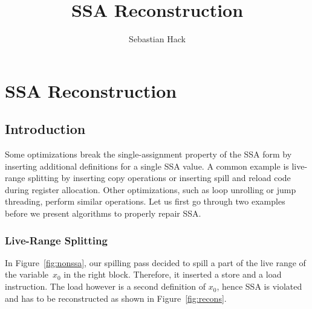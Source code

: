 
\newcommand{\var}[1]{\mathtt{#1}}

\title{SSA Reconstruction}
\author{Sebastian Hack}

\chapter{SSA Reconstruction }
\graphicspath{{repair_maintain_ssa_after_optimization/}{part1/repair_maintain_ssa_after_optimization/}}



\section{Introduction}

Some optimizations break the single-assignment property of the SSA form by inserting additional definitions for a single SSA value.
A common example is live-range splitting by inserting copy operations or inserting spill and reload code during register allocation.
Other optimizations, such as loop unrolling or jump threading, perform similar operations.
Let us first go through two examples before we present algorithms to properly repair SSA.

\subsection{Live-Range Splitting}

In Figure~\ref{fig:nonssa}, our spilling pass decided to spill a part of the live range of the variable~$x_0$ in the right block.
Therefore, it inserted a store and a load instruction. 
The load however is a second definition of $x_0$, hence SSA is violated and has to be reconstructed as shown in Figure~\ref{fig:recons}.


